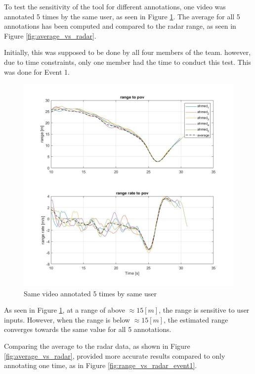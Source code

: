 To test the sensitivity of the tool for different annotations, one video was annotated 5 times by the same user, as seen in Figure \ref{fig:same_vid_5times}. The average for all 5 annotations has been computed and compared to the radar range, as seen in Figure \ref{fig:average_vs_radar}.

Initially, this was supposed to be done by all four members of the team. however, due to time constraints, only one member had the time to conduct this test. This was done for Event 1.

\begin{figure}[H]
    \centering
    \includegraphics[width=\textwidth]{Figures/user_comparison.jpg}
    \caption{Same video annotated 5 times by same user}
    \label{fig:same_vid_5times}
\end{figure}

As seen in Figure \ref{fig:same_vid_5times}, at a range of above $\approx 15[m]$, the range is sensitive to user inputs. However, when the range is below  $\approx 15[m]$, the estimated range converges towards the same value for all 5 annotations.

Comparing the average to the radar data, as shown in Figure \ref{fig:average_vs_radar}, provided more accurate results compared to only annotating one time, as in Figure \ref{fig:range_vs_radar_event1}.

